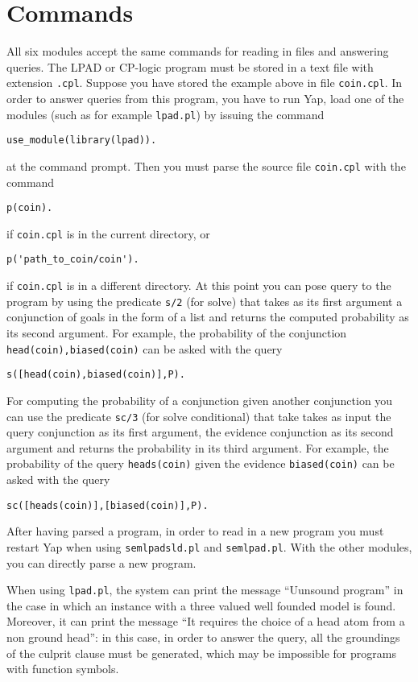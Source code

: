 \documentclass[a4paper,12pt]{article}
\begin{document}
\section{Commands}
All six modules accept the same commands for reading in files and answering queries.
The LPAD or CP-logic program must be stored in a text file with extension \texttt{.cpl}. Suppose you have stored the example above in file \texttt{coin.cpl}. 
In order to answer queries from this program, you have to run Yap,
load one of the modules (such as for example \texttt{lpad.pl}) by issuing  the command
\begin{verbatim}
use_module(library(lpad)).
\end{verbatim}
at the command prompt.
Then you must parse the source file \texttt{coin.cpl}  with the command
\begin{verbatim}
p(coin).
\end{verbatim}
if \texttt{coin.cpl} is in the current directory, or 
\begin{verbatim}
p('path_to_coin/coin').
\end{verbatim}
if \texttt{coin.cpl} is in a different directory.
At this point you can pose query to the program by using the predicate \texttt{s/2} (for solve) that takes as its first argument a conjunction of goals in the form of a list and returns the computed probability as its second argument. For example, the probability of the conjunction \texttt{head(coin),biased(coin)} can be asked with the query
\begin{verbatim}
s([head(coin),biased(coin)],P).
\end{verbatim}
For computing the probability of a conjunction given another conjunction you can use the predicate \texttt{sc/3} (for solve conditional) that take takes as input the query conjunction as its first argument, the evidence conjunction as its second argument and returns the probability in its third argument.
For example, the probability of  the query \texttt{heads(coin)} given the evidence \texttt{biased(coin)} can be asked with the query
\begin{verbatim}
sc([heads(coin)],[biased(coin)],P).
\end{verbatim}
After having parsed a program, in order to read in a new program you must restart Yap when using 
\texttt{semlpadsld.pl} and \texttt{semlpad.pl}. With the other modules, you can directly parse a new program.

When using \texttt{lpad.pl}, the system can print the message ``Uunsound program'' in the case in which an instance with a three valued well founded model is found.  Moreover, it can print the message ``It requires the choice of a head atom from a non ground head'': in this case, in order to answer the query, all the groundings of the culprit clause must be generated, which may be impossible for programs with function symbols. 
\end{document}
